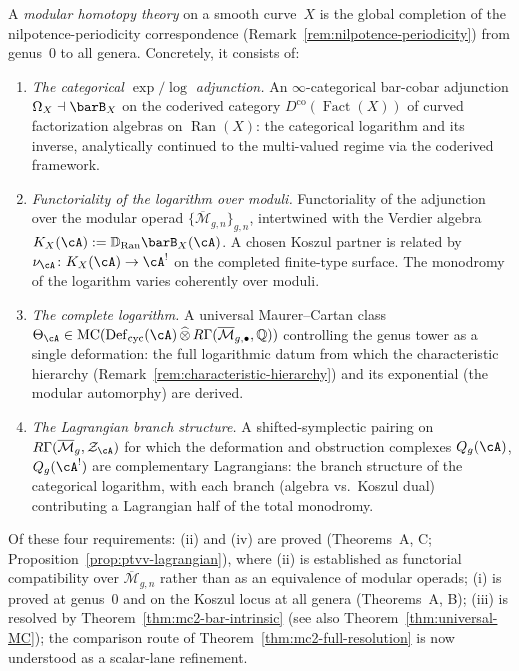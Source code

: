 \begin{definition}
\label{def:modular-homotopy-theory-working}
A \emph{modular homotopy theory} on a smooth curve~$X$ is the
global completion of the nilpotence-periodicity correspondence
(Remark~\ref{rem:nilpotence-periodicity}) from genus~$0$ to all
genera. Concretely, it consists of:
\begin{enumerate}[label=\textup{(\roman*)}]
\item \emph{The categorical $\exp/\log$ adjunction.} An
 $\infty$-categorical bar-cobar adjunction
 $\Omega_X \dashv \barB_X$ on the coderived category
 $D^{\mathrm{co}}(\operatorname{Fact}(X))$ of curved factorization
 algebras on $\operatorname{Ran}(X)$: the categorical logarithm and
 its inverse, analytically continued to the multi-valued regime via
 the coderived framework.
\item \emph{Functoriality of the logarithm over moduli.}
 Functoriality of the adjunction over the modular operad
 $\{\overline{\mathcal{M}}_{g,n}\}_{g,n}$, intertwined with the
 Verdier algebra
 $K_X(\cA):=\mathbb{D}_{\operatorname{Ran}}\barB_X(\cA)$.
 A chosen Koszul partner is related by
 $\nu_{\cA}\colon K_X(\cA)\to\cA^!$ on the completed finite-type
 surface. The monodromy of the logarithm varies coherently over moduli.
\item \emph{The complete logarithm.} A universal Maurer--Cartan class
 $\Theta_{\cA} \in
 \operatorname{MC}(\operatorname{Def}_{\mathrm{cyc}}(\cA)
 \,\widehat{\otimes}\,
 R\Gamma(\overline{\mathcal{M}}_{g,\bullet}, \mathbb{Q}))$
 controlling the genus tower as a single deformation: the full
 logarithmic datum from which the characteristic hierarchy
 (Remark~\ref{rem:characteristic-hierarchy}) and
 its exponential (the modular automorphy) are derived.
\item \emph{The Lagrangian branch structure.} A shifted-symplectic
 pairing on
 $R\Gamma(\overline{\mathcal{M}}_g, \mathcal{Z}_{\cA})$
 for which the deformation and obstruction complexes
 $Q_g(\cA)$, $Q_g(\cA^!)$ are complementary Lagrangians: the
 branch structure of the categorical logarithm, with each
 branch (algebra vs.\ Koszul dual) contributing a Lagrangian
 half of the total monodromy.
\end{enumerate}
\end{definition}

\noindent
Of these four requirements: (ii) and (iv) are proved
(Theorems~A, C; Proposition~\ref{prop:ptvv-lagrangian}),
where (ii) is established as functorial compatibility over
$\overline{\mathcal{M}}_{g,n}$ rather than as an equivalence of
modular operads;
(i) is proved at genus~$0$ and on the Koszul locus at all genera
(Theorems~A, B); (iii) is resolved by
Theorem~\ref{thm:mc2-bar-intrinsic}
(see also Theorem~\ref{thm:universal-MC}); the
comparison route of Theorem~\ref{thm:mc2-full-resolution} is now
understood as a scalar-lane refinement.

